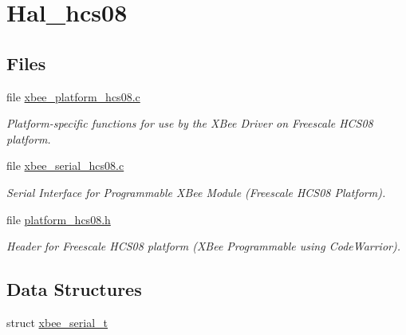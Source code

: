 \hypertarget{group__hal__hcs08}{}\section{Hal\+\_\+hcs08}
\label{group__hal__hcs08}
\subsection*{Files}
\begin{DoxyCompactItemize}
\item 
file \hyperlink{xbee__platform__hcs08_8c}{xbee\+\_\+platform\+\_\+hcs08.\+c}
\begin{DoxyCompactList}\small\item\em Platform-\/specific functions for use by the X\+Bee Driver on Freescale H\+C\+S08 platform. \end{DoxyCompactList}\item 
file \hyperlink{xbee__serial__hcs08_8c}{xbee\+\_\+serial\+\_\+hcs08.\+c}
\begin{DoxyCompactList}\small\item\em Serial Interface for Programmable X\+Bee Module (Freescale H\+C\+S08 Platform). \end{DoxyCompactList}\item 
file \hyperlink{platform__hcs08_8h}{platform\+\_\+hcs08.\+h}
\begin{DoxyCompactList}\small\item\em Header for Freescale H\+C\+S08 platform (X\+Bee Programmable using Code\+Warrior). \end{DoxyCompactList}\end{DoxyCompactItemize}
\subsection*{Data Structures}
\begin{DoxyCompactItemize}
\item 
struct \hyperlink{structxbee__serial__t}{xbee\+\_\+serial\+\_\+t}
\end{DoxyCompactItemize}
